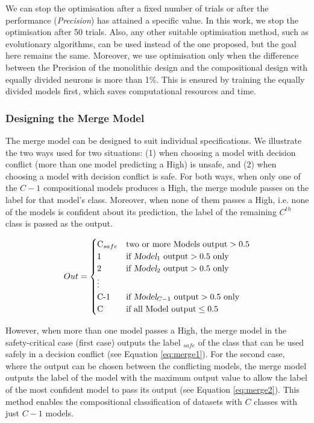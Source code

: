 We can stop the optimisation after a fixed number of trials or after the performance (\textit{Precision}) has attained a specific value. In this work, we stop the optimisation after 50 trials. Also, any other suitable optimisation method, such as evolutionary algorithms, can be used instead of the one proposed, but the goal here remains the same. Moreover, we use optimisation only when the difference between the Precision of the monolithic design and the compositional design with equally divided neurons is more than 1\%. This is ensured by training the equally divided models first, which saves computational resources and time. 


\subsubsection{Designing the Merge Model}

The merge model can be designed to suit individual specifications. We illustrate the two ways used for two situations: (1) when choosing a model with decision conflict (more than one model predicting a High) is unsafe, and (2) when choosing a model with decision conflict is safe. For both ways, when only one of the $C-1$ compositional models produces a High, the merge module passes on the label for that model's class. Moreover, when none of them passes a High, i.e. none of the models is confident about its prediction, the label of the remaining $C^{th}$ class is passed as the output. 

\begin{equation}
  Out =\begin{cases}
  \text{C}_{safe} & \text{two or more Models output}  > 0.5\\
  1 & \text{if } \textsl{Model}_1 \text{ output} > 0.5 \text{ only}\\
  2 & \text{if } \textsl{Model}_2  \text{ output} > 0.5 \text{ only}\\
  \vdots & \\
  \text{C-1} & \text{if } \textsl{Model}_{C-1} \text{ output} > 0.5 \text{ only}\\
  \text{C} & \text{if all Model output} \leq 0.5
\end{cases}
\label{eq:merge1}
\end{equation}


However, when more than one model passes a High, the merge model in the safety-critical case (first case) outputs the label $_{safe}$ of the class that can be used safely in a decision conflict (see Equation \ref{eq:merge1}). For the second case, where the output can be chosen between the conflicting models, the merge model outputs the label of the model with the maximum output value to allow the label of the most confident model to pass its output (see Equation \ref{eq:merge2}). This method enables the compositional classification of datasets with $C$ classes with just $C-1$ models. 


